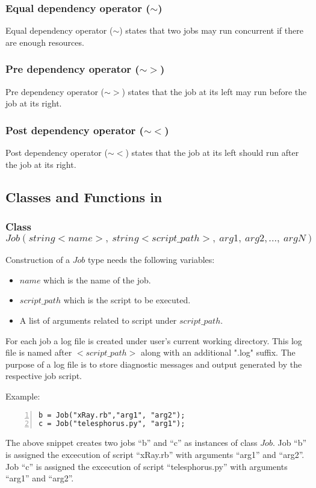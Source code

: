 \subsubsection*{Equal dependency operator ($\sim$)}
Equal dependency operator ($\sim$) states that two jobs may run concurrent if there
are enough resources.
\subsubsection*{Pre dependency operator ($\sim>$)}
Pre dependency operator ($\sim>$) states that the job at its left may run before the job
at its right.
\subsubsection*{Post dependency operator ($\sim<$)}
Post dependency operator ($\sim<$) states that the job at its left should run after the job
at its right.

\subsection*{Classes and Functions in \lang{}}
\subsubsection*{Class $Job(string <name>,~ string <script\_path>,~arg1,~arg2, ...,~argN)$}
Construction of a $Job$ type needs the following variables:
\begin{itemize}
\item $name$ which is the name of the job.
\item $script\_path$ which is the script to be executed.
\item A list of arguments related to script under $script\_path$.\\
\end{itemize}
For each \lang{} job a log file is created under user's current working directory. This
log file is named after $<script\_path>$ along with an additional ".log" suffix. The purpose
of a log file is to store diagnostic messages and output generated by the respective job script.

Example:
\begin{Verbatim}[numbers=left]
b = Job("xRay.rb","arg1", "arg2");
c = Job("telesphorus.py", "arg1");
\end{Verbatim}

The above snippet creates two jobs ``b'' and ``c'' as instances of class $Job$.
Job ``b'' is assigned the excecution of script ``xRay.rb'' with arguments ``arg1'' and ``arg2''.
Job ``c'' is assigned the excecution of script ``telesphorus.py'' with arguments ``arg1'' and ``arg2''.



